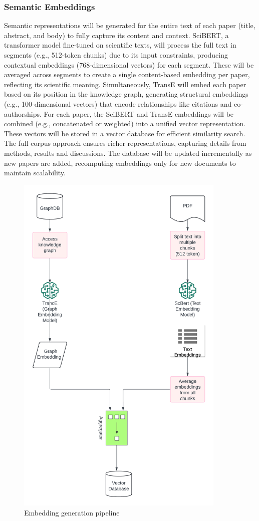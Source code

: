 \documentclass[a4paper,12pt]{article}
\begin{document}
\subsubsection{Semantic Embeddings}
Semantic representations will be generated for the entire text of each paper
(title, abstract, and body) to fully capture its content and context. SciBERT,
a transformer model fine-tuned on scientific texts, will process the full text
in segments (e.g., 512-token chunks) due to its input constraints, producing
contextual embeddings (768-dimensional vectors) for each segment. These will be
averaged across segments to create a single content-based embedding per paper,
reflecting its scientific meaning. Simultaneously, TransE will embed each paper
based on its position in the knowledge graph, generating structural embeddings
(e.g., 100-dimensional vectors) that encode relationships like citations and
co-authorships. For each paper, the SciBERT and TransE embeddings will be combined
(e.g., concatenated or weighted) into a unified vector representation. These vectors
will be stored in a vector database for efficient similarity search. The full corpus
approach ensures richer representations, capturing details from methods, results and
discussions. The database will be updated incrementally as new papers are added,
recomputing embeddings only for new documents to maintain scalability.
\begin{figure}[H]
    \centering
    \includegraphics[width=10cm]{semanticembedding.png}
    \caption{Embedding generation pipeline}
\end{figure}
\newpage
\end{document}
